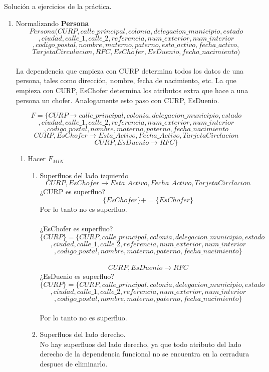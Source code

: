 \documentclass{article}
\begin{document}
Solución a ejercicios de la práctica.\\
\begin{enumerate}

	\item Normalizando \textbf{Persona}
							$$Persona(CURP, calle\_principal, colonia, delegacion\_municipio, estado$$
			$$, ciudad, calle\_1, calle\_2, referencia, num\_exterior, num\_interior$$
			$$,codigo\_postal, nombre, materno, paterno, esta\_activo, fecha\_activo,$$ $$TarjetaCirculacion, RFC, EsChofer, EsDuenio, fecha\_nacimiento)$$\\
			
			La dependencia que empieza con CURP determina todos los datos de una persona, tales como dirección, nombre, fecha de nacimiento, etc. La que empieza con CURP, EsChofer determina los atributos extra que hace a una persona un chofer. Analogamente esto paso con CURP, EsDuenio.
			
			$$F = \{CURP \rightarrow calle\_principal, colonia, delegacion\_municipio, estado$$ $$,ciudad, calle\_1,calle\_2, referencia, num\_exterior, num\_interior$$
			$$, codigo\_postal, nombre, materno, paterno, fecha\_nacimiento$$
			$$CURP,EsChofer \rightarrow Esta\_Activo, Fecha\_Activo, TarjetaCirclacion$$
			$$CURP,EsDuenio \rightarrow RFC\}$$
				\begin{enumerate}
					\item Hacer $F_{MIN}$\\
					
					\begin{enumerate}
						\item Superfluos del lado izquierdo\\
						$$CURP,EsChofer \rightarrow Esta\_Activo, Fecha\_Activo, TarjetaCirclacion$$
						¿CURP es superfluo?
						$$\{EsChofer\}+=\{EsChofer\}$$
						Por lo tanto no es superfluo.\\\\
						¿EsChofer es superfluo?
						$$\{CURP\} = \{CURP, calle\_principal, colonia, delegacion\_municipio, estado$$ $$,ciudad, calle\_1,calle\_2, referencia, num\_exterior, num\_interior$$
						$$, codigo\_postal, nombre, materno, paterno, fecha\_nacimiento\}$$\\
						$$CURP,EsDuenio \rightarrow RFC$$
						¿EsDuenio es superfluo?
							$$\{CURP\} = \{CURP, calle\_principal, colonia, delegacion\_municipio, estado$$ $$,ciudad, calle\_1,calle\_2, referencia, num\_exterior, num\_interior$$
						$$, codigo\_postal, nombre, materno, paterno, fecha\_nacimiento\}$$\\
						Por lo tanto no es superfluo.\\
						\item Superfluos del lado derecho.\\
						No hay superfluos del lado derecho, ya que todo atributo del lado derecho de la dependencia funcional no se encuentra en la cerradura despues de eliminarlo.
					\end{enumerate}
				

\end{enumerate}
\end{enumerate}
\end{document}
